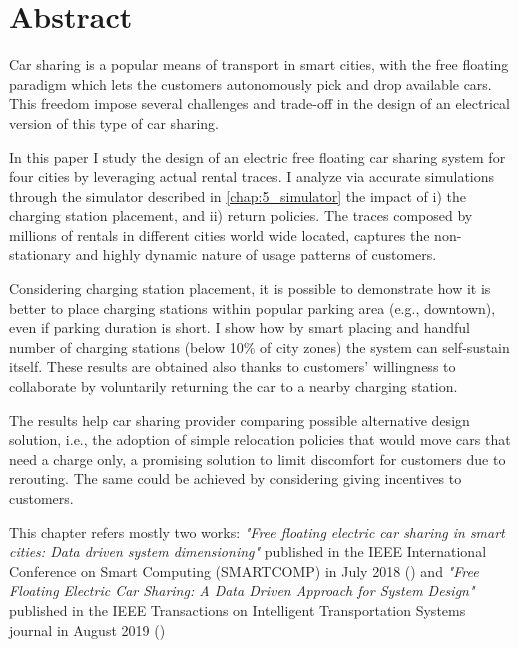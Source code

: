 \section{Abstract}

Car sharing is a popular means of transport in smart cities, with the free floating paradigm which lets the customers autonomously pick and drop available cars. This freedom impose several challenges and trade-off in the design of an electrical version of this type of car sharing. 

In this paper I study the design of an electric free floating car sharing system for four cities by leveraging actual rental traces. I analyze via accurate simulations through the simulator described in \ref{chap:5_simulator} the impact of i) the charging station placement, and ii) return policies.
The traces composed by millions of rentals in different cities world wide located, captures the non-stationary and highly dynamic nature of usage patterns of customers.

Considering charging station placement, it is possible to demonstrate how it is better to place charging stations within popular parking area (e.g., downtown), even if parking duration is short. I show how by smart placing and handful number of charging stations (below 10\% of city zones) the system can self-sustain itself. 
These results are obtained also thanks to customers' willingness to collaborate by voluntarily returning the car to a nearby charging station.

The results help car sharing provider comparing possible alternative design solution, i.e.,  the adoption of simple relocation policies that would move cars that need a charge only, a promising solution to limit discomfort for customers due to rerouting. The same could be achieved by considering giving incentives to customers. 

This chapter refers mostly two works: \textit{"Free floating electric car sharing in smart cities: Data driven system dimensioning"} published in the IEEE International Conference on Smart Computing (SMARTCOMP) in July 2018 (\cite{taormina}) and \textit{"Free Floating Electric Car Sharing: A Data Driven Approach for System Design"} published in the IEEE Transactions on Intelligent Transportation Systems journal in August 2019 (\cite{coccacar})
